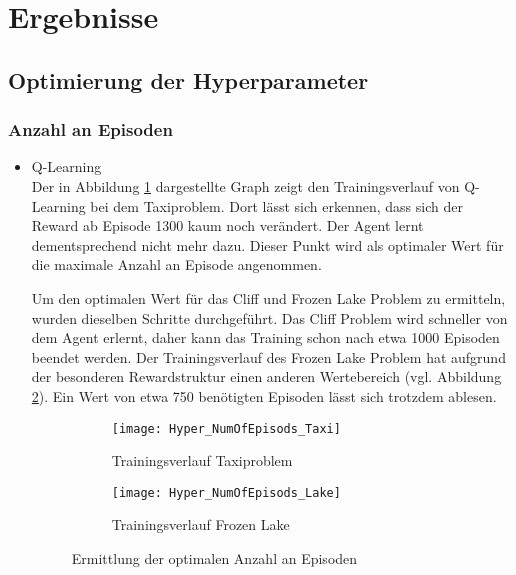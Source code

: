 \section{Ergebnisse}

\subsection{Optimierung der Hyperparameter}

\subsubsection{Anzahl an Episoden}
\begin{itemize}
    \item Q-Learning\\
    Der in Abbildung \ref{fig:NumOfEpisods_Taxi} dargestellte Graph zeigt den Trainingsverlauf von Q-Learning bei dem Taxiproblem. Dort lässt sich erkennen, dass sich der Reward ab Episode 1300 kaum noch verändert. Der Agent lernt dementsprechend nicht mehr dazu. 
    Dieser Punkt wird als optimaler Wert für die maximale Anzahl an Episode angenommen.

    Um den optimalen Wert für das Cliff und Frozen Lake Problem zu ermitteln, wurden dieselben Schritte durchgeführt.
    Das Cliff Problem wird schneller von dem Agent erlernt, daher kann das Training schon nach etwa 1000 Episoden beendet werden.
    Der Trainingsverlauf des Frozen Lake Problem hat aufgrund der besonderen Rewardstruktur einen anderen Wertebereich (vgl. Abbildung \ref{fig:NumOfEpisods_Lake}). Ein Wert von etwa 750 benötigten Episoden lässt sich trotzdem ablesen.
    
    \begin{figure}[H]
      \centering
      \begin{subfigure}{.5\textwidth}
        \centering
        \texttt{[image: Hyper\_NumOfEpisods\_Taxi]}
        \caption{Trainingsverlauf Taxiproblem}
        \label{fig:NumOfEpisods_Taxi}
      \end{subfigure}%
      \begin{subfigure}{.5\textwidth}
        \centering
        \texttt{[image: Hyper\_NumOfEpisods\_Lake]}
        \caption{Trainingsverlauf Frozen Lake}
        \label{fig:NumOfEpisods_Lake}
      \end{subfigure}
      \caption{Ermittlung der optimalen Anzahl an Episoden}
      \label{fig:NumOfEpisods_Taxi_Q-Learning}
  \end{figure}


\end{itemize}

